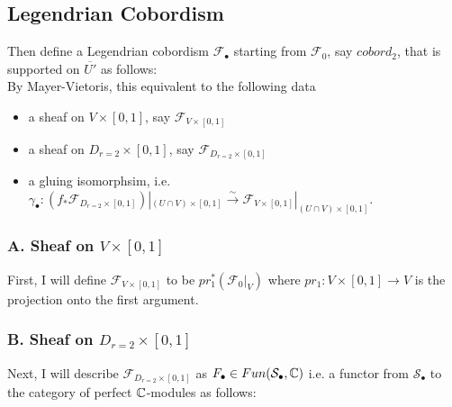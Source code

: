 \subsection*{Legendrian Cobordism}
Then define a Legendrian cobordism $\mathscr{F}_\bullet$ starting from $\mathscr{F}_0$, say $cobord_2$, that is supported on $\overline{U'}$ as follows:\\

By Mayer-Vietoris, this equivalent to the following data
\begin{itemize}
\item a sheaf on $V\times [0,1]$, say $\mathscr{F}_{V\times [0,1]}$

\item a sheaf on $D_{r=2}\times [0,1]$, say $\mathscr{F}_{D_{r=2}\times [0,1]}$

\item a gluing isomorphsim, i.e. $\gamma_\bullet : (f_*\mathscr{F}_{D_{r=2}\times [0,1]})|_{(U\cap V)\times [0,1]} \xrightarrow{\sim} \mathscr{F}_{V\times [0,1]}|_{(U\cap V)\times [0,1]}$.
\end{itemize}
\subsubsection{A. Sheaf on $V\times [0,1]$}
First, I will define $\mathscr{F}_{V\times [0,1]}$ to be $pr_1^*(\mathscr{F}_0|_V)$ where $pr_1 : V \times [0,1] \rightarrow V$ is the projection onto the first argument.
\subsubsection{B. Sheaf on $D_{r=2}\times [0,1]$}
Next, I will describe $\mathscr{F}_{D_{r=2}\times [0,1]}$ as $F_\bullet \in Fun(\mathcal{S}_\bullet,\mathbb{C})$ i.e. a functor from $\mathcal{S}_\bullet$ to the category of perfect $\mathbb{C}$-modules as follows: 

